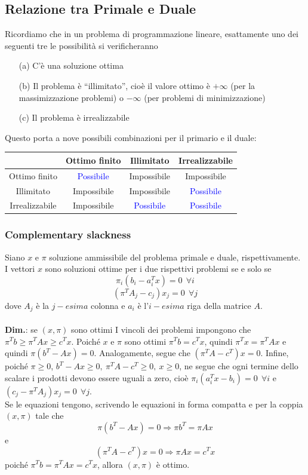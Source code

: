 \documentclass[12pt,a4paper]{article}
\begin{document}
\subsection{Relazione tra Primale e Duale}
Ricordiamo che in un problema di programmazione lineare, esattamente uno dei seguenti tre le possibilità si verificheranno
\begin{itemize}
\item[(a)] C'è una soluzione ottima
\item[(b)] Il problema è “illimitato”, cioè il valore ottimo è $+\infty$ (per la massimizzazione problemi) o $-\infty$ (per problemi di minimizzazione)
\item[(c)] Il problema è irrealizzabile
\end{itemize}
Questo porta a nove possibili combinazioni per il primario e il duale:
\begin{center}
\begin{tabular}{|c||c|c|c|}
\hline
& Ottimo finito & Illimitato & Irrealizzabile\\ \hline
Ottimo finito & \textcolor{blue}{Possibile} & Impossibile & Impossibile\\
Illimitato & Impossibile & Impossibile & \textcolor{blue}{Possibile}\\
Irrealizzabile & Impossibile & \textcolor{blue}{Possibile} & \textcolor{blue}{Possibile}\\ \hline
\end{tabular}
\end{center}

\subsubsection{Complementary slackness}
Siano $x$ e $\pi$ soluzione ammissibile del problema primale e duale, rispettivamente. I vettori $x$ sono soluzioni ottime per i due rispettivi problemi se e solo se
$$\pi_i(b_i-a_i^Tx)=0\ \ \forall i$$
$$(\pi^TA_j -c_j)x_j = 0\ \ \forall j$$
dove $A_j$ è la $j-esima$ colonna e $a_i$ è l'$i-esima$ riga della matrice $A$.\\
\\
\textbf{Dim.}: se $(x, \pi)$ sono ottimi I vincoli dei problemi impongono che $\pi^Tb \geq \pi^TAx \geq c^Tx$. Poiché $x$ e $\pi$ sono ottimi $\pi^Tb = c^Tx$, quindi $\pi^Tx = \pi^TAx$ e quindi $\pi(b^T - Ax) = 0$. Analogamente, segue che $(\pi^TA -c^T )x = 0$. Infine, poiché $\pi \geq 0$, $b^T - Ax \geq 0,\ \pi^TA - c^T \geq 0, \ x \geq 0$, ne segue che ogni termine dello scalare i prodotti devono essere uguali a zero, cioè $\pi_i(a^T_ix - b_i) = 0 \ \ \forall i$ e $(c_j - \pi^TA_j )x_j = 0\ \ \forall j$.\\
Se le equazioni tengono, scrivendo le equazioni in forma compatta e per la coppia $(x, \pi)$ tale che $$\pi(b^T-Ax)= 0 \Rightarrow \pi b^T=\pi Ax$$
e $$(\pi^TA-c^T)x=0\Rightarrow \pi Ax=c^Tx$$
poiché $\pi^T b = \pi^T  Ax = c^T x$, allora $(x, \pi)$ è ottimo.
\end{document}

